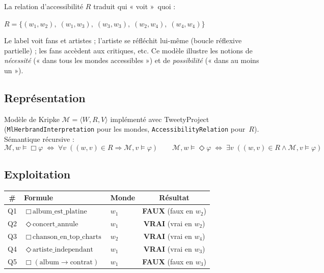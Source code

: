 \documentclass[11pt, a4paper]{article}
\newcommand{\code}[1]{\texttt{#1}}
\newcommand{\nec}{\Box}
\newcommand{\pos}{\Diamond}
\begin{document}
\noindent La relation d'accessibilité $R$ traduit qui « voit »~quoi :
\begin{center}
\small $R = \{(w_1, w_2),\; (w_1, w_3),\; (w_3, w_3),\; (w_2, w_4),\; (w_4, w_4)\}$
\end{center}

\noindent Le label voit fans et artistes ; l'artiste se réfléchit lui-même
(boucle réflexive partielle) ; les fans accèdent aux critiques, etc. Ce
modèle illustre les notions de \emph{nécessité} (« dans tous les mondes
accessibles ») et de \emph{possibilité} (« dans au moins un »).

\subsection*{Représentation}

Modèle de Kripke $\mathcal{M} = \langle W, R, V\rangle$ implémenté avec
TweetyProject (\code{MlHerbrandInterpretation} pour les mondes,
\code{AccessibilityRelation} pour~$R$). Sémantique récursive :
\[
\mathcal{M}, w \models \nec\varphi \;\Leftrightarrow\; \forall v\;((w,v)\in R \Rightarrow \mathcal{M}, v \models \varphi)
\qquad
\mathcal{M}, w \models \pos\varphi \;\Leftrightarrow\; \exists v\;((w,v)\in R \land \mathcal{M}, v \models \varphi)
\]

\subsection*{Exploitation}

\begin{center}\small
\begin{tabular}{cllc}
\toprule
\textbf{\#} & \textbf{Formule} & \textbf{Monde} & \textbf{Résultat} \\
\midrule
Q1 & $\nec\,\text{album\_est\_platine}$       & $w_1$ & \textbf{FAUX} (faux en $w_2$) \\
Q2 & $\pos\,\text{concert\_annule}$           & $w_1$ & \textbf{VRAI} (vrai en $w_2$) \\
Q3 & $\nec\,\text{chanson\_en\_top\_charts}$ & $w_2$ & \textbf{VRAI} (vrai en $w_4$) \\
Q4 & $\pos\,\text{artiste\_independant}$     & $w_1$ & \textbf{VRAI} (vrai en $w_3$) \\
Q5 & $\nec(\text{album} \to \text{contrat})$ & $w_1$ & \textbf{FAUX} (faux en $w_3$) \\
\bottomrule
\end{tabular}
\end{center}
\end{document}
